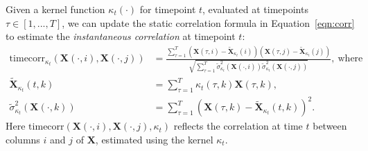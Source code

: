 \documentclass[english]{article}
\begin{document}
Given a kernel function $\kappa_t(\cdot)$ for timepoint $t$,
evaluated at timepoints $\tau \in \left[ 1, ..., T \right]$, we
can update the static correlation formula in Equation~\ref{eqn:corr}
to estimate the \textit{instantaneous correlation} at timepoint $t$:
\begin{align}
  \mathrm{timecorr}_{\kappa_t}\left(\mathbf{X}(\cdot, i), \mathbf{X}(\cdot, j)\right) &= \frac{\sum_{\tau=1}^T \left( \mathbf{X}(\tau, i) -
                                       \widetilde{\mathbf{X}}_{\kappa_t}(i) \right)
                                 \left( \mathbf{X}(\tau, j) -
                                        \widetilde{\mathbf{X}}_{\kappa_t}(j)\right)}
              {\sqrt{\sum_{\tau=1}^T
                                              \widetilde{\sigma}_{\kappa_t}^2(\mathbf{X}(\cdot,
                                                                                        i))
                                              \widetilde{\sigma}_{\kappa_t}^2(\mathbf{X}(\cdot, j))}},~\mathrm{where}\\\label{eqn:timecorr}
  \widetilde{\mathbf{X}}_{\kappa_t}(t, k) &= \sum_{\tau=1}^T
                       \kappa_t(\tau, k)\mathbf{X}(\tau, k),\\
  \widetilde{\sigma}_{\kappa_t}^2(\mathbf{X}(\cdot, k)) &= \sum_{\tau=1}^T
                                                  \left(
                                                  \mathbf{X}(\tau, k) -
                            \widetilde{\mathbf{X}}_{\kappa_t}(t, k) \right)^2.
\end{align}
Here $\mathrm{timecorr}(\mathbf{X}(\cdot, i), \mathbf{X}(\cdot, j),
  \kappa_t)$ reflects the correlation at time $t$ between columns $i$
  and $j$ of $\mathbf{X}$, estimated using the kernel $\kappa_t$.
\end{document}
